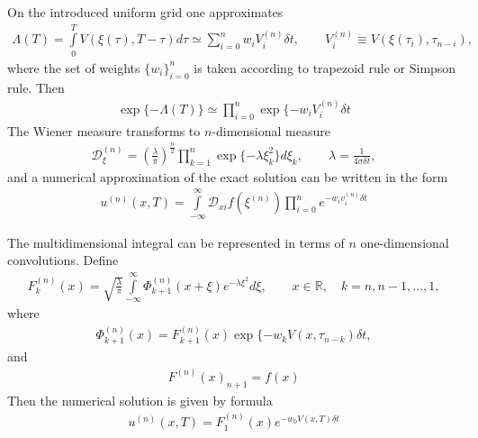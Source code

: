 \documentclass[11pt,a4paper]{extarticle}
\begin{document}
On the introduced uniform grid one approximates
\begin{equation}
    \begin{aligned}
    \nonumber
        \Lambda(T) = \int\limits_0^T V(\xi(\tau), T - \tau) d\tau \simeq \sum\limits_{i=0}^n w_i V_i^{(n)} \delta t, \qquad V_i^{(n)} \equiv V(\xi(\tau_i), \tau_{n-i}),
    \end{aligned}
\end{equation}
where the set of weights $\{w_i\}_{i=0}^n$ is taken according to trapezoid rule or Simpson rule.
Then
\begin{equation}
    \begin{aligned}
    \nonumber
    \exp\{-\Lambda(T)\} \simeq \prod\limits_{i=0}^n \exp\{-w_i V_i^(n) \delta t
    \end{aligned}
\end{equation}
The Wiener measure transforms to $n$\/-dimensional measure
\begin{equation}
    \begin{aligned}
    \nonumber
    \mathcal D_\xi^{(n)} = \left( \frac\lambda\pi \right)^{\frac n2} \prod\limits_{k=1}^n \exp\{-\lambda \xi_k^2\} d\xi_k, \qquad \lambda = \frac1{4\sigma \delta t},
    \end{aligned}
\end{equation}
and a numerical approximation of the exact solution can be written in the form
\begin{equation}
    \begin{aligned}
    \nonumber
    u^{(n)}(x, T) = \int\limits_{-\infty}^\infty \mathcal D_{xi} f(\xi^{(n)}) \prod\limits_{i=0}^n e^{-w_i v_i^{(n)}\delta t}
    \end{aligned}
\end{equation}

The multidimensional integral can be represented in terms of $n$ one-dimensional convolutions.
Define
\begin{equation}
    \begin{aligned}
    \nonumber
    F_k^{(n)}(x) = \sqrt{\frac\lambda\pi} \int\limits_{-\infty}^{\infty} \Phi_{k+1}^{(n)}(x+\xi) e^{-\lambda \xi^2} d\xi, \qquad x\in \mathbb R, \quad k = n, n-1, \dots, 1,
    \end{aligned}
\end{equation}
where
\begin{equation}
    \begin{aligned}
    \nonumber
    \Phi_{k+1}^{(n)}(x) = F^{(n)}_{k+1}(x)\exp\{-w_k V(x, \tau_{n-k}) \delta t,
    \end{aligned}
\end{equation}
and
\begin{equation}
    \begin{aligned}
    \nonumber
    F^{(n)}(x)_{n+1} = f(x)
    \end{aligned}
\end{equation}
Then the numerical solution is given by formula
\begin{equation}
    \begin{aligned}
    \nonumber
    u^{(n)}(x, T) = F_1^{(n)}(x) e^{-w_0 V(x, T) \delta t}
    \end{aligned}
\end{equation}
\end{document}
